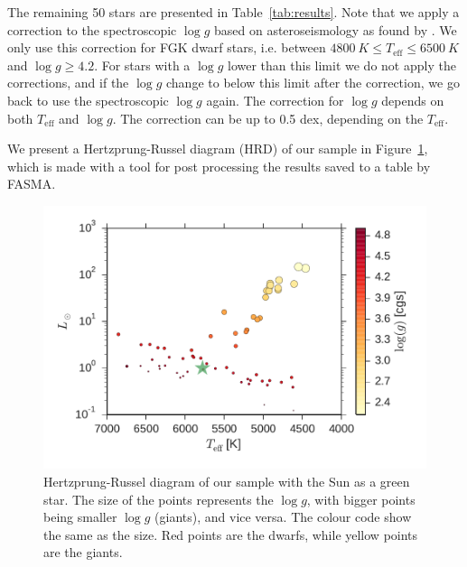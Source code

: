 \documentclass{aa}
\begin{document}
The remaining 50 stars are presented in Table~\ref{tab:results}. Note that we
apply a correction to the spectroscopic $\log g$ based on asteroseismology as
found by \citet{Mortier2014}. We only use this correction for FGK dwarf stars,
i.e. between $\SI{4800}{K}\leq T_\mathrm{eff} \leq \SI{6500}{K}$ and $\log
g\geq4.2$. For stars with a $\log g$ lower than this limit we do not apply the
corrections, and if the $\log g$ change to below this limit after the
correction, we go back to use the spectroscopic $\log g$ again. The correction
for $\log g$ depends on both $T_\mathrm{eff}$ and $\log g$. The correction can
be up to 0.5 dex, depending on the $T_\mathrm{eff}$.

We present a Hertzprung-Russel diagram (HRD) of our sample in
Figure~\ref{fig:HRD}, which is made with a tool for post processing the results
saved to a table by FASMA.

\begin{figure}[tpb]
    \centering
    \includegraphics[width=1.0\linewidth,natwidth=440,natheight=290]{figures/HR.pdf}
    \caption{Hertzprung-Russel diagram of our sample with the Sun as a green
    star. The size of the points represents the $\log g$, with bigger points
    being smaller $\log g$ (giants), and vice versa. The colour code show the
    same as the size. Red points are the dwarfs, while yellow points are the
    giants.}
    \label{fig:HRD}
\end{figure}
\end{document}
